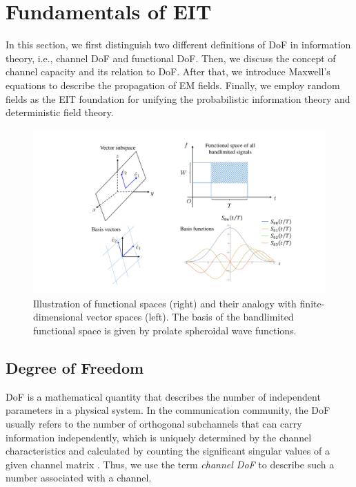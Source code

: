 \documentclass[journal,twocolumn]{IEEEtran}
\begin{document}
\section{Fundamentals of EIT}
In this section, we first distinguish two different definitions of DoF in information theory, i.e., channel DoF and functional DoF.  
Then, we discuss the concept of channel capacity and its relation to DoF. 
After that, we introduce Maxwell's equations to describe the propagation of EM fields. 
Finally, we employ random fields as the EIT foundation for unifying the probabilistic information theory and deterministic field theory. 

\begin{figure}
	\centering 
	\includegraphics[width=\linewidth]{figures/PSWF.pdf} 
	\caption{Illustration of functional spaces (right) and their analogy with finite-dimensional vector spaces (left). The basis of the bandlimited functional space is given by prolate spheroidal wave functions. }
	\label{fig:PSWF}
\end{figure}

\subsection{Degree of Freedom}
\label{Sec_2_Subsec_1}
DoF is a mathematical quantity that describes the number of independent parameters in a physical system. 
In the communication community, the DoF usually refers to the number of orthogonal subchannels that can carry information independently, which is uniquely determined by the channel characteristics and calculated by counting the significant singular values of a given channel matrix \cite{goldsmith2003capacity}. 
Thus, we use the term {{\emph{channel DoF}}} to describe such a number associated with a channel.
\end{document}
